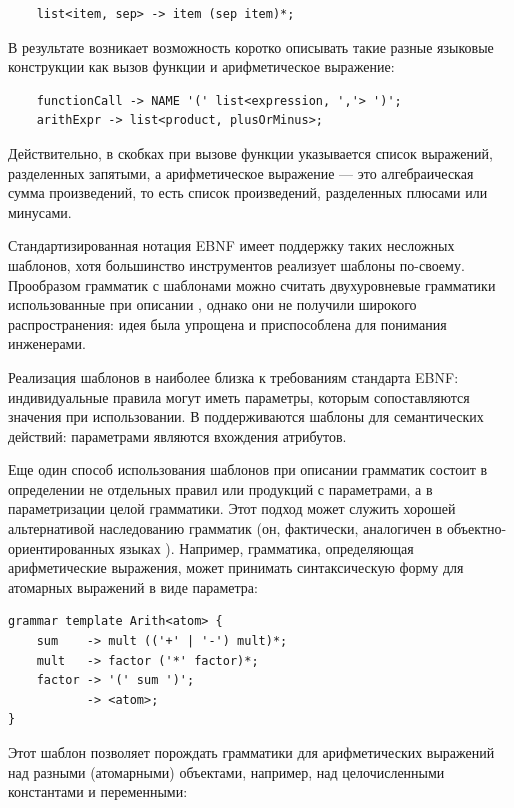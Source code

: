 \begin{lstlisting}
	list<item, sep> -> item (sep item)*;
\end{lstlisting}

В результате возникает возможность коротко описывать такие разные языковые конструкции как вызов функции и арифметическое выражение:

\begin{lstlisting}
	functionCall -> NAME '(' list<expression, ','> ')';
	arithExpr -> list<product, plusOrMinus>;
\end{lstlisting}

Действительно, в скобках при вызове функции указывается список выражений, разделенных запятыми, а арифметическое выражение --- это алгебраическая сумма произведений, то есть список произведений, разделенных плюсами или минусами.

Стандартизированная нотация EBNF \cite{EBNF} имеет поддержку таких несложных шаблонов, хотя большинство инструментов реализует шаблоны по-своему. Прообразом грамматик с шаблонами можно считать двухуровневые грамматики \cite{???} использованные при описании  \cite{Algol68}, однако они не получили широкого распространения: идея была упрощена и приспособлена для понимания инженерами.

Реализация шаблонов в  наиболее близка к требованиям стандарта EBNF: индивидуальные правила могут иметь параметры, которым сопоставляются значения при использовании. В  поддерживаются шаблоны для семантических действий: параметрами являются вхождения атрибутов.

Еще один способ использования шаблонов при описании грамматик состоит в определении не отдельных правил или продукций с параметрами, а в параметризации целой грамматики. Этот подход может служить хорошей альтернативой наследованию грамматик (он, фактически, аналогичен  в объектно-ориентированных языках \cite{Gamma1995}). Например, грамматика, определяющая арифметические выражения, может принимать синтаксическую форму для атомарных выражений в виде параметра:

\begin{lstlisting}
grammar template Arith<atom> {
	sum    -> mult (('+' | '-') mult)*;
	mult   -> factor ('*' factor)*;
	factor -> '(' sum ')';
	       -> <atom>;
}
\end{lstlisting}

Этот шаблон позволяет порождать грамматики для арифметических выражений над разными (атомарными) объектами, например, над целочисленными константами и переменными:

